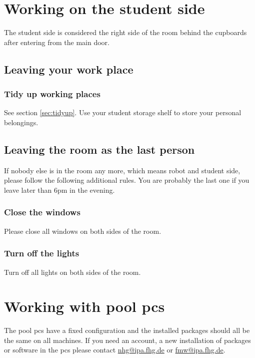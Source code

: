 \section{Working on the student side}
The student side is considered the right side of the room behind the cupboards after entering from the main door.

\subsection{Leaving your work place}

\subsubsection{Tidy up working places}
See section \ref{sec:tidyup}. Use your student storage shelf to store your personal belongings.

\subsection{Leaving the room as the last person}
If nobody else is in the room any more, which means robot and student side, please follow the following additional rules. You are probably the last one if you leave later than 6pm in the evening.

\subsubsection{Close the windows}
Please close all windows on both sides of the room.

\subsubsection{Turn off the lights}
Turn off all lights on both sides of the room.


\section{Working with pool pcs}
The pool pcs have a fixed configuration and the installed packages should all be the same on all machines. If you need an account, a new installation of packages or software in the pcs please contact \href{mailto:nhg@ipa.fhg.de}{nhg@ipa.fhg.de} or \href{mailto:fmw@ipa.fhg.de}{fmw@ipa.fhg.de}.

